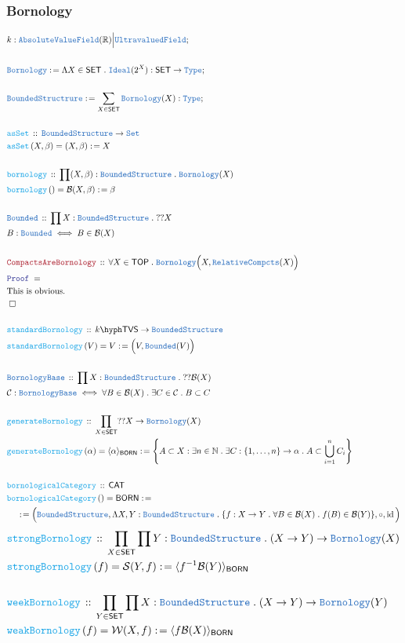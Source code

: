 \documentclass[12pt]{scrartcl}
\newcommand{\TYPE}[1]{\textcolor{NavyBlue}{\mathtt{#1}}}
\newcommand{\FUNC}[1]{\textcolor{Cerulean}{\mathtt{#1}}}
\newcommand{\LOGIC}[1]{\textcolor{Blue}{\mathtt{#1}}}
\newcommand{\THM}[1]{\textcolor{Maroon}{\mathtt{#1}}}
\renewcommand{\.}{\; . \;}
\newcommand{\de}{: \kern 0.1pc =}
\newcommand{\Act}[1]{\left( #1 \right)}
\newcommand{\Theorem}[2]{& \THM{#1} \, :: \, #2 \\ & \Proof = \\ }
\newcommand{\DeclareType}[2]{& \TYPE{#1} \, :: \, #2 \\}
\newcommand{\DefineType}[3]{& #1 : \TYPE{#2} \iff #3 \\}
\newcommand{\DeclareFunc}[2]{& \FUNC{#1} \, :: \, #2 \\}
\newcommand{\DefineNamedFunc}[4]{&  \FUNC{#1}\Act{#2} = #3 \de #4 \\}
\newcommand{\NewLine}{\\ & \kern 1pc}
\newcommand{\Page}[1]{ \begin{align*} #1 \end{align*}   }
\newcommand{\Explain}[1]{& \text{#1.} \\}
\newcommand{\Type}{\TYPE{Type}}
\newcommand{\Reals}{\mathbb{R} }
\newcommand{\Nat}{\mathbb{N} }
\DeclareMathOperator*{\id}{id}
\newcommand{\Set}{\TYPE{Set}}
\newcommand{\Ideal}{\TYPE{Ideal}}
\newcommand{\Conclude}[3]{& #1 \de #2 : #3; \\}
\newcommand{\QED}{\; \square}
\newcommand{\EndProof}{& \QED \\}
\newcommand{\Proof}{\LOGIC{Proof} \; }
\renewcommand{\C}{\mathcal{C}}
\newcommand{\B}{\mathcal{B}}
\newcommand{\CAT}{\mathsf{CAT}}
\newcommand{\SET}{\mathsf{SET}}
\newcommand{\TOP}{\mathsf{TOP}}
\newcommand{\Bounded}{\TYPE{Bounded}}
\renewcommand{\S}{\mathcal{S}}
\renewcommand{\S}{\mathbf{S}}
\newcommand{\W}{\mathcal{W}}
\renewcommand{\S}{\mathcal{S}}
\newcommand{\AVF}{\TYPE{AbsoluteValueField}}
\newcommand{\Born}{\TYPE{Bornology}}
\newcommand{\BS}{\TYPE{BoundedStructure}}
\newcommand{\BB}{\TYPE{BornologyBase}}
\newcommand{\TVS}[1]{{#1}\hyph\mathsf{TVS}}
\newcommand{\BORN}{\mathsf{BORN}}
\begin{document}
\subsubsection{Bornology}
\Page{
	& k : \AVF(\Reals) \Big| \TYPE{UltravaluedField} ; \\
	\\
	\Conclude{\TYPE{Bornology}}{
		\Lambda X \in \SET \. 
		\Ideal(2^X)
	}{\SET \to \Type}
	\\
	\Conclude{\TYPE{BoundedStructrure}}{
		\sum_{X \in \SET} \TYPE{Bornology}(X)
	}{\Type}
	\\
	\DeclareFunc{asSet}{\BS \to \Set}
	\DefineNamedFunc{asSet}{X,\beta}{(X,\beta)}{X}
	\\
	\DeclareFunc{bornology}{\prod (X,\beta) : \BS \. \TYPE{Bornology}(X)}
	\DefineNamedFunc{bornology}{}{\B(X,\beta)}{\beta}
	\\
	\DeclareType{Bounded}{\prod X : \BS \. ??X}
	\DefineType{B}{Bounded}{B \in \B(X)}
	\\
	\Theorem{CompactsAreBornology}
	{
		\forall X \in \TOP \. \Born\Big(X,\TYPE{RelativeCompcts}(X)\Big)
	}  	
	\Explain{This is obvious}
	\EndProof
	\\
	\DeclareFunc{standardBornology}
	{
		 \TVS{k} \to \BS 
	}
	\DefineNamedFunc{standardBornology}{V}{V}{\Big(V,\Bounded(V)\Big)}
	\\
	\DeclareType{BornologyBase}
	{
		\prod X : \BS \. ??\B(X)
	}
	\DefineType{\C}{\BB}{\forall B \in \B(X) \. \exists C \in \C \. B \subset C}
	\\
	\DeclareFunc{generateBornology}
	{
		\prod_{X \in \SET} ??X \to \Born(X)
	}
	\DefineNamedFunc{generateBornology}{\alpha}{\langle \alpha \rangle_{\mathsf{BORN}}}
	{
		\left\{ A \subset X : 
			\exists n \in \Nat \.  
			\exists C : \{1,\ldots,n\} \to \alpha \.
			 A \subset \bigcup^n_{i=1} C_i   \right\}
	}
	\\
	\DeclareFunc{bornologicalCategory}
	{
		\CAT
	}
	\DefineNamedFunc{bornologicalCategory}{}{\BORN}
	{
		\NewLine \de		
		\Big( \BS , \Lambda X,Y : \BS \. \{ f : X \to Y \. \forall B \in \B(X) \. f(B) \in \B(Y)   \},
			\circ, \id \Big)
	}
}\Page{
	\DeclareFunc{strongBornology}
	{
		\prod_{X \in \SET} \prod Y : \BS \. (X \to Y) \to \Born(X)
	}
	\DefineNamedFunc{strongBornology}{f}{\S(Y,f)}
	{
		\langle  f^{-1} \B(Y) \rangle_{\mathsf{BORN}}
	}
	\\
	\DeclareFunc{weekBornology}
	{
		\prod_{Y \in \SET} \prod X : \BS \. (X \to Y) \to \Born(Y)
	}
	\DefineNamedFunc{weakBornology}{f}{\W(X,f)}
	{
		\langle  f \B(X) \rangle_{\BORN} 
	}
	\\
}
\end{document}
